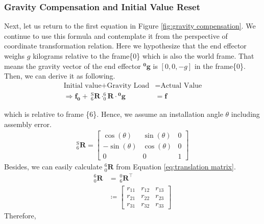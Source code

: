 \subsubsection{Gravity Compensation and Initial Value Reset}
\hspace*{5mm}Next, let us return to the first equation in Figure \ref{fig:gravity compensation}. We continue to use this formula and contemplate it from the perspective of coordinate transformation relation. Here we hypothesize that the end effector weighs $g$ kilograms relative to the frame\{0\} which is also the world frame. That means the gravity vector of the end effector $\boldsymbol{^0\!g}$ is $[0,0,-g]$ in the frame\{0\}. Then, we can derive it as following.
\begin{equation}
\begin{split}
\text{Initial value}	+ \text{Gravity Load} 		&= \text{Actual Value} \\
\Rightarrow
\boldsymbol{f_0} +\  ^\mathrm{S}_6\mathbf{R} \cdot ^6_0\!\mathbf{R} \cdot \boldsymbol{^0\!g} &= \boldsymbol{f}
\end{split}
\end{equation}
\par
which is relative to frame \{6\}.
Hence, we assume an installation angle $\theta$ including assembly error.
\begin{equation}
\begin{split}
 ^\mathrm{S}_6\mathbf{R}
=
\begin{bmatrix}
\cos(\theta)	&\sin(\theta)	&0 \\
-\sin(\theta)	&\cos(\theta)	&0 \\
0				&0				&1
\end{bmatrix}
\end{split}
\end{equation}
Besides, we can easily calculate $^6_0\mathbf{R}$ from Equation \ref{eq:translation matrix}.
\begin{equation}
\begin{split}
^6_0\mathbf{R} 	&=\ ^0_6\mathbf{R}^\top\\
				&\coloneqq
\begin{bmatrix}
r_{11}		&r_{12}		&r_{13} \\
r_{21}		&r_{22}		&r_{23} \\
r_{31}		&r_{32}		&r_{33}
\end{bmatrix}
\end{split}
\end{equation}
Therefore,
